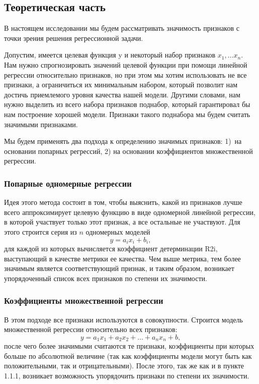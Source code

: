 \documentclass[a4paper,12pt]{article}
\begin{document}
\subsection{Теоретическая часть}


В настоящем исследовании мы будем рассматривать значимость признаков с точки зрения решения регрессионной задачи. 


Допустим, имеется целевая функция y и некоторый набор признаков 
$x_1, \dots x_n$. Нам нужно спрогнозировать значений целевой функции при помощи линейной регрессии относительно признаков, но при этом мы хотим использовать не все признаки, а ограничиться их минимальным набором, который позволит нам достичь приемлемого уровня качества нашей модели. Другими словами, нам нужно выделить из всего набора признаков поднабор, который гарантировал бы нам построение хорошей модели. Признаки такого поднабора мы будем считать значимыми признаками.


Мы будем применять два подхода к определению значимых признаков: 1) на основании попарных регрессий, 2) на основании коэффициентов множественной регрессии.


\subsubsection{Попарные одномерные регрессии}

Идея этого метода состоит в том, чтобы выяснить, какой из признаков лучше всего аппроксимирует целевую функцию в виде одномерной линейной регрессии, в которой участвует только этот признак, а все остальные не участвуют. Для этого строится серия из $n$ одномерных моделей 
$$
y = a_ix_i + b_i,
$$
для каждой из которых вычисляется коэффициент детерминации R2i, выступающий в качестве метрики ее качества. Чем выше метрика, тем более значимым является соответствующий признак, и таким образом, возникает упорядоченный список всех признаков по степени их значимости.

\subsubsection{Коэффициенты множественной регрессии}

В этом подходе все признаки используются в совокупности. Строится модель множественной регрессии относительно всех признаков:
$$
y = a_1x_1 + a_2x_2 + … + a_nx_n + b,
$$
после чего более значимыми считаются те признаки, коэффициенты при которых больше по абсолютной величине (так как коэффициенты модели могут быть как положительными, так и отрицательными). После этого, так же как и в пункте 1.1.1, возникает возможность упорядочить признаки по степени их значимости.
\end{document}
